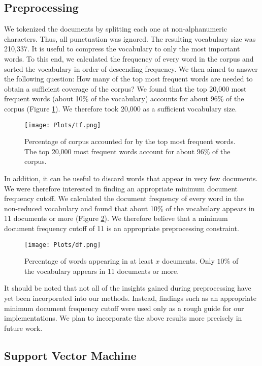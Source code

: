 \documentclass[12pt]{article}
\begin{document}
\subsection{Preprocessing}

We tokenized the documents by splitting each one at non-alphanumeric characters. Thus, all punctuation was ignored. The resulting vocabulary size was 210,337. It is useful to compress the vocabulary to only the most important words. To this end, we calculated the frequency of every word in the corpus and sorted the vocabulary in order of descending frequency. We then aimed to answer the following question: How many of the top most frequent words are needed to obtain a sufficient coverage of the corpus? We found that the top 20,000 most frequent words (about 10\% of the vocabulary) accounts for about 96\% of the corpus (Figure \ref{fig-freqs}). We therefore took 20,000 as a sufficient vocabulary size.

\begin{figure}
\centering
\texttt{[image: Plots/tf.png]}
\caption{\label{fig-freqs} Percentage of corpus accounted for by the top most frequent words. The top 20,000 most frequent words account for about $96\%$ of the corpus.}
\end{figure}

In addition, it can be useful to discard words that appear in very few documents. We were therefore interested in finding an appropriate minimum document frequency cutoff. We calculated the document frequency of every word in the non-reduced vocabulary and found that about 10\% of the vocabulary appears in 11 documents or more (Figure \ref{fig-df}). We therefore believe that a minimum document frequency cutoff of 11 is an appropriate preprocessing constraint.

\begin{figure}
\centering
\texttt{[image: Plots/df.png]}
\caption{\label{fig-df} Percentage of words appearing in at least $x$ documents. Only $10\%$ of the vocabulary appears in 11 documents or more.}
\end{figure}

It should be noted that not all of the insights gained during preprocessing have yet been incorporated into our methods. Instead, findings such as an appropriate minimum document frequency cutoff were used only as a rough guide for our implementations. We plan to incorporate the above results more precisely in future work.

\subsection{Support Vector Machine}
\end{document}
